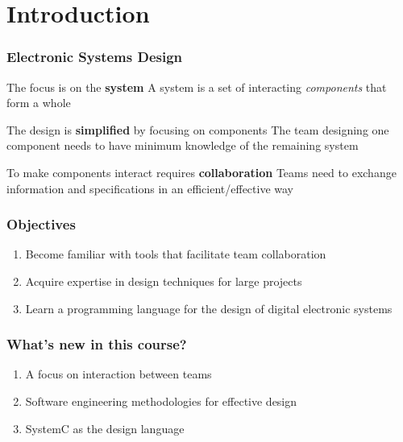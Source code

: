 \section{Introduction}

\begin{frame}
\frametitle{Electronic Systems Design}
\begin{block}{The focus is on the {\bfseries system}}
A system is a set of interacting {\em components} that form a whole
\end{block}
\pause
\begin{exampleblock}{The design is {\bfseries simplified} by focusing on components}
The team designing one component needs to have minimum knowledge of the remaining system
\end{exampleblock}
\pause
\begin{alertblock}{To make components interact requires {\bfseries collaboration}}
Teams need to exchange information and specifications in an efficient/effective way
\end{alertblock}
\end{frame}

\begin{frame}
\frametitle{Objectives}
\begin{enumerate}
\item Become familiar with tools that facilitate team collaboration
\item Acquire expertise in design techniques for large projects
\item Learn a programming language for the design of digital electronic systems
\end{enumerate}
\end{frame}

\begin{frame}
\frametitle{What's new in this course?}
\begin{enumerate}
\item A focus on interaction between teams
\item Software engineering methodologies for effective design
\item SystemC as the design language
\end{enumerate}
\end{frame}

